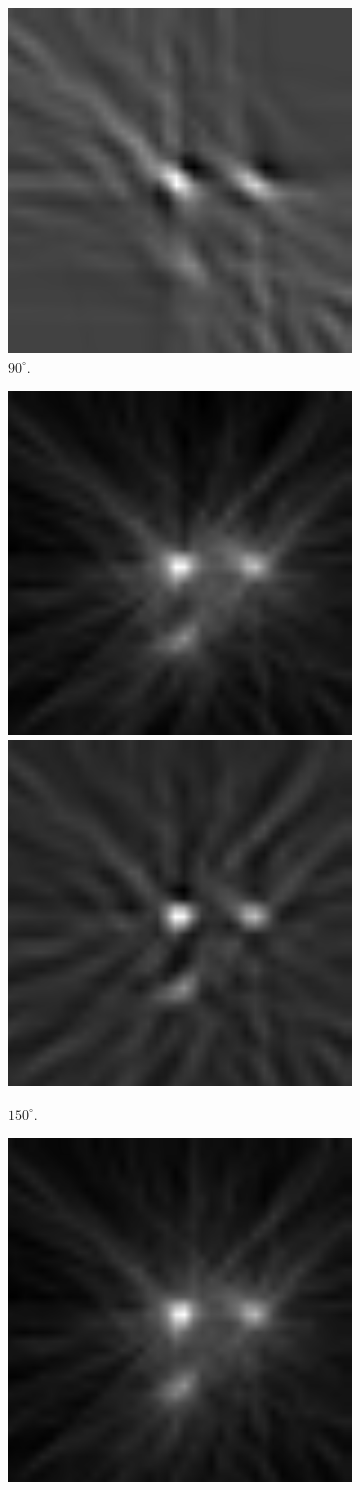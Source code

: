 \documentclass[slug=PET, room=Andreas-Schubert-Bau\,\ 424A, supervisor=Carsten\ Bittrich, coursedate=10.\ 01.\ 2020]{../../Lab_Report_LaTeX/lab_report}
\begin{document}
\begin{figure}[htp]
\begin{subfigure}{0.5\textwidth}
    \includegraphics[width=.4\textwidth]{../messungen/oliTOM1/9_gefiltert.png}
    \caption{\(90^\circ\).}
    \label{eq:tom1-90}
  \end{subfigure}
  \begin{subfigure}{0.5\textwidth}
    \centering
    \includegraphics[width=.4\textwidth]{../messungen/oliTOM1/13_einfach.png}
    \includegraphics[width=.4\textwidth]{../messungen/oliTOM1/13_gefiltert.png}
    \caption{\(150^\circ\).}
    \label{eq:tom1-150}
  \end{subfigure}
  \begin{subfigure}{0.5\textwidth}
    \centering
    \includegraphics[width=.4\textwidth]{../messungen/oliTOM1/15_einfach.png}

\end{subfigure}
\end{figure}
\end{document}
